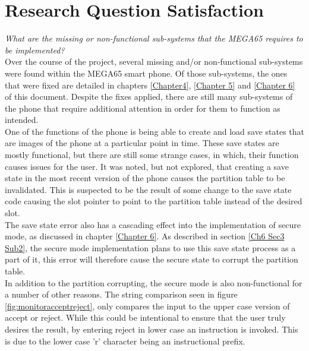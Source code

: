 
\section{Research Question Satisfaction}

\label{Ch7 Sec3}

\textit{What are the missing or non-functional sub-systems that the MEGA65 requires to be implemented?}\\
Over the course of the project, several missing and/or non-functional sub-systems were found within the MEGA65 smart phone. 
Of those sub-systems, the ones that were fixed are detailed in chapters \ref{Chapter4}, \ref{Chapter 5} and \ref{Chapter 6} of this document. 
Despite the fixes applied, there are still many sub-systems of the phone that require additional attention in order for them to function as intended.\\
One of the functions of the phone is being able to create and load save states that are images of the phone at a particular point in time. 
These save states are mostly functional, but there are still some strange cases, in which, their function causes issues for the user. 
It was noted, but not explored, that creating a save state in the most recent version of the phone causes the partition table to be invalidated. 
This is suspected to be the result of some change to the save state code causing the slot pointer to point to the partition table instead of the desired slot.\\
The save state error also has a cascading effect into the implementation of secure mode, as discussed in chapter \ref{Chapter 6}. 
As described in section \ref{Ch6 Sec3 Sub2}, the secure mode implementation plans to use this save state process as a part of it, this error will therefore cause the secure state to corrupt the partition table.\\
In addition to the partition corrupting, the secure mode is also non-functional for a number of other reasons. 
The string comparison seen in figure \ref{fig:monitoracceptreject}, only compares the input to the upper case version of accept or reject. 
While this could be intentional to ensure that the user truly desires the result, by entering reject in lower case an instruction is invoked. 
This is due to the lower case 'r' character being an instructional prefix. 
